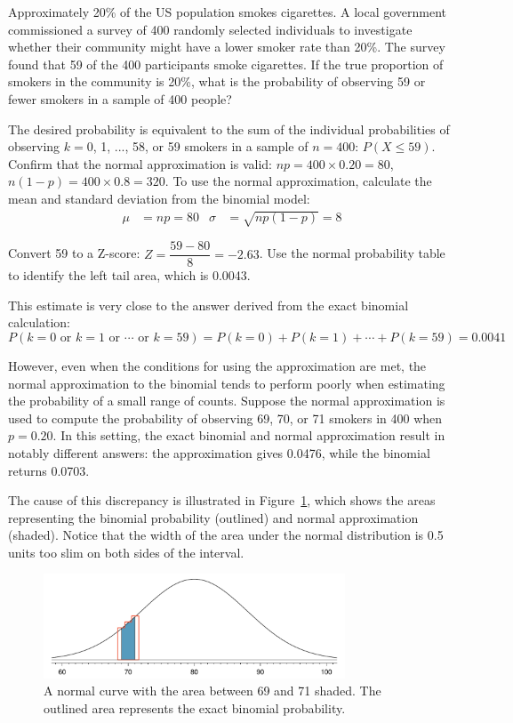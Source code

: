 \begin{example}{Approximately 20\% of the US population smokes cigarettes. A local government commissioned a survey of 400 randomly selected individuals to investigate whether their community might have a lower smoker rate than 20\%. The survey found that 59 of the 400 participants smoke cigarettes. If the true proportion of smokers in the community is 20\%, what is the probability of observing 59 or fewer smokers in a sample of 400 people?}\label{approxBinomialForN400P20SmokerExample}
		
The desired probability is equivalent to the sum of the individual probabilities of observing $k=0$, 1, ..., 58, or 59 smokers in a sample of $n=400$: $P(X \leq 59)$. Confirm that the normal approximation is valid: $np=400\times 0.20=80$, $n(1-p)=400\times 0.8=320$. To use the normal approximation, calculate the mean and standard deviation from the binomial model:
\begin{align*}
		\mu &= np = 80
		&\sigma &= \sqrt{np(1-p)} = 8
\end{align*}
		
Convert 59 to a Z-score: $Z = \dfrac{59-80}{8} = -2.63$. Use the normal probability table to identify the left tail area, which is 0.0043. 
		
This estimate is very close to the answer derived from the exact binomial calculation:
\[P(k=0\text{ or }k=1\text{ or }\cdots\text{ or } k=59) = P(k=0) + P(k=1) + \cdots + P(k=59) = 0.0041 \]
\end{example}
	
However, even when the conditions for using the approximation are met, the normal approximation to the binomial tends to perform poorly when estimating the probability of a small range of counts. Suppose the normal approximation is used to compute the probability of observing 69, 70, or 71 smokers in 400 when $p=0.20$. In this setting, the exact binomial and normal approximation result in notably different answers: the approximation gives 0.0476, while the binomial returns 0.0703.
	
The cause of this discrepancy is illustrated in Figure~\ref{normApproxToBinomFail}, which shows the areas representing the binomial probability (outlined) and normal approximation (shaded). Notice that the width of the area under the normal distribution is 0.5 units too slim on both sides of the interval.
	
\begin{figure}[h]
		\centering
		\includegraphics[width=0.80\textwidth]{ch_distributions_oi_biostat/figures/normApproxToBinomFail/normApproxToBinomFail}
		\caption{A normal curve with the area between 69 and 71 shaded. The outlined area represents the exact binomial probability.}
		\label{normApproxToBinomFail}
\end{figure}
	

